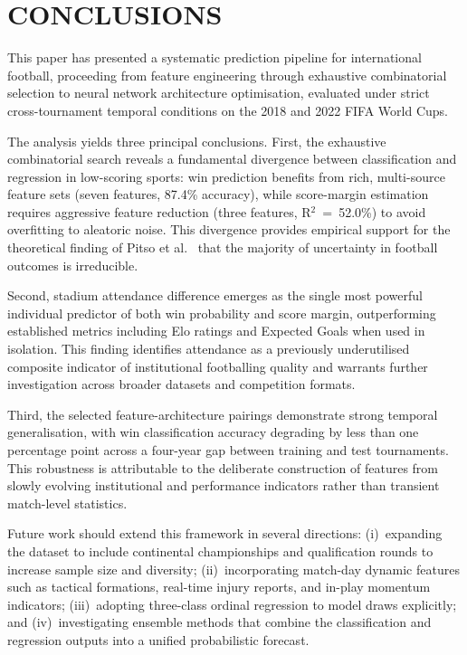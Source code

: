 \documentclass[a4paper,twoside]{article}
\begin{document}
\section{\uppercase{Conclusions}}
\label{sec:conclusion}

\noindent
This paper has presented a systematic prediction pipeline for international football, proceeding from feature engineering through exhaustive combinatorial selection to neural network architecture optimisation, evaluated under strict cross-tournament temporal conditions on the 2018 and 2022 FIFA World Cups.

The analysis yields three principal conclusions.
First, the exhaustive combinatorial search reveals a fundamental divergence between classification and regression in low-scoring sports: win prediction benefits from rich, multi-source feature sets (seven features, 87.4\% accuracy), while score-margin estimation requires aggressive feature reduction (three features, R$^{2}$~=~52.0\%) to avoid overfitting to aleatoric noise.
This divergence provides empirical support for the theoretical finding of Pitso et al.\ \cite{pitso_bayesian_2026} that the majority of uncertainty in football outcomes is irreducible.

Second, stadium attendance difference emerges as the single most powerful individual predictor of both win probability and score margin, outperforming established metrics including Elo ratings and Expected Goals when used in isolation.
This finding identifies attendance as a previously underutilised composite indicator of institutional footballing quality and warrants further investigation across broader datasets and competition formats.

Third, the selected feature-architecture pairings demonstrate strong temporal generalisation, with win classification accuracy degrading by less than one percentage point across a four-year gap between training and test tournaments.
This robustness is attributable to the deliberate construction of features from slowly evolving institutional and performance indicators rather than transient match-level statistics.

Future work should extend this framework in several directions: (i)~expanding the dataset to include continental championships and qualification rounds to increase sample size and diversity; (ii)~incorporating match-day dynamic features such as tactical formations, real-time injury reports, and in-play momentum indicators; (iii)~adopting three-class ordinal regression to model draws explicitly; and (iv)~investigating ensemble methods that combine the classification and regression outputs into a unified probabilistic forecast.



{\small
}
\end{document}
